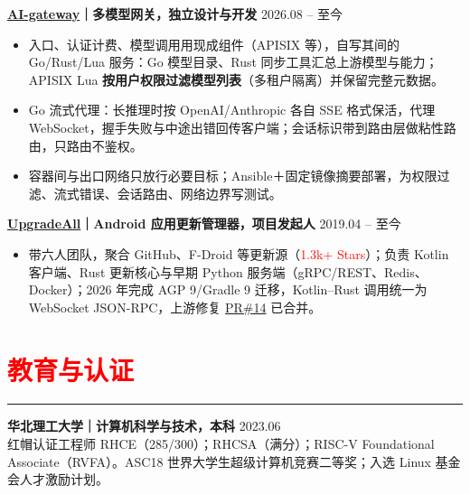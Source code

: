 \documentclass[10pt,a4paper]{article}
\begin{document}
\textbf{\href{https://github.com/xz-dev/AI-gateway}{AI-gateway}｜多模型网关，独立设计与开发} \hfill 2026.08 -- 至今
\begin{itemize}
	\item 入口、认证计费、模型调用用现成组件（APISIX 等），自写其间的 Go/Rust/Lua 服务：Go 模型目录、Rust 同步工具汇总上游模型与能力；APISIX Lua \textbf{按用户权限过滤模型列表}（多租户隔离）并保留完整元数据。
	\item Go 流式代理：长推理时按 OpenAI/Anthropic 各自 SSE 格式保活，代理 WebSocket，握手失败与中途出错回传客户端；会话标识带到路由层做粘性路由，只路由不鉴权。
	\item 容器间与出口网络只放行必要目标；Ansible＋固定镜像摘要部署，为权限过滤、流式错误、会话路由、网络边界写测试。
\end{itemize}

\textbf{\href{https://github.com/DUpdateSystem/UpgradeAll}{UpgradeAll}｜Android 应用更新管理器，项目发起人} \hfill 2019.04 -- 至今
\begin{itemize}
	\item 带六人团队，聚合 GitHub、F-Droid 等更新源（\textcolor{red}{1.3k+ Stars}）；负责 Kotlin 客户端、Rust 更新核心与早期 Python 服务端（gRPC/REST、Redis、Docker）；2026 年完成 AGP 9/Gradle 9 迁移，Kotlin–Rust 调用统一为 WebSocket JSON-RPC，上游修复 \href{https://github.com/MatrixDev/GradleAndroidRustPlugin/pull/14}{PR\#14} 已合并。
\end{itemize}

\section*{\textcolor{red}{教育与认证}}
\vspace*{-4ex}
\noindent\textcolor{red}{\rule{\linewidth}{0.4pt}}
\textbf{华北理工大学｜计算机科学与技术，本科} \hfill 2023.06\\
红帽认证工程师 RHCE（285/300）；RHCSA（满分）；RISC-V Foundational Associate（RVFA）。ASC18 世界大学生超级计算机竞赛二等奖；入选 Linux 基金会人才激励计划。
\end{document}
